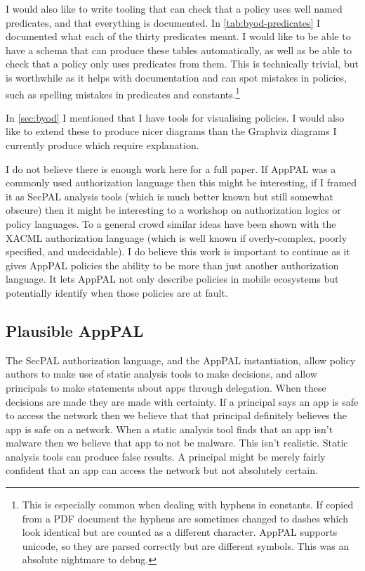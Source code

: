 \documentclass[a4paper]{scrartcl}
\begin{document}
I would also like to write tooling that can check that a policy uses well named
predicates, and that everything is documented.  In \autoref{tab:byod-predicates}
I documented what each of the thirty predicates meant.  I would like to be able
to have a schema that can produce these tables automatically, as well as be able to
check that a policy only uses predicates from them.  This is technically
trivial, but is worthwhile as it helps with documentation and can spot mistakes
in policies, such as spelling mistakes in predicates and constants.\footnote{This is
  especially common when dealing with hyphens in constants.  If copied from a
  PDF document the hyphens are sometimes changed to dashes which look identical
  but are counted as a different character.  AppPAL supports unicode, so they
  are parsed correctly but are different symbols.  This was an absolute
  nightmare to debug.}

In \autoref{sec:byod} I mentioned that I have tools for visualising policies.  I
would also like to extend these to produce nicer diagrams than the Graphviz
diagrams I currently produce which require explanation.

I do not believe there is enough work here for a full paper.  If AppPAL was a
commonly used authorization language then this might be interesting, if I framed
it as SecPAL analysis tools (which is much better known but still somewhat
obscure) then it might be interesting to a workshop on authorization logics or
policy languages.   To a general crowd similar ideas have been shown with the
XACML authorization language (which is well known if overly-complex, poorly
specified, and undecidable).  I do believe this work is important to continue as
it gives AppPAL policies the ability to be more than just another authorization
language. It lets AppPAL not only describe policies in mobile ecosystems but
potentially identify when those policies are at fault.

\subsection{Plausible AppPAL}
\label{sec:plausible}

The SecPAL authorization language, and the AppPAL instantiation, allow policy
authors to make use of static analysis tools to make decisions, and allow
principals to make statements about apps through delegation. When these
decisions are made they are made with certainty. If a principal says an app is
safe to access the network then we believe that that principal definitely
believes the app is safe on a network. When a static analysis tool finds that an
app isn't malware then we believe that app to not be malware. This isn't
realistic. Static analysis tools can produce false results. A principal might be
merely fairly confident that an app can access the network but not absolutely
certain.
\end{document}
